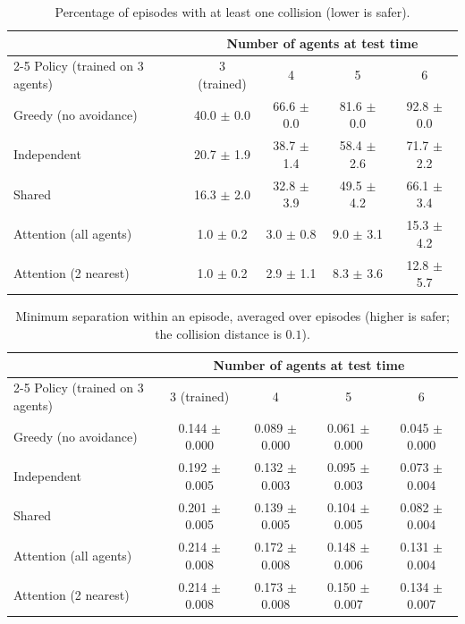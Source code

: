 \begin{table}[t]
  \centering\small
  \caption{Percentage of episodes with at least one collision (lower is safer).}
  \label{tab:pt-collision}
\begin{tabular}{l cccc}
\toprule
 & \multicolumn{4}{c}{Number of agents at test time} \\
\cmidrule(lr){2-5}
Policy (trained on 3 agents) & 3 (trained) & 4 & 5 & 6 \\
\midrule
Greedy (no avoidance) & 40.0 $\pm$ 0.0 & 66.6 $\pm$ 0.0 & 81.6 $\pm$ 0.0 & 92.8 $\pm$ 0.0 \\
\midrule
Independent & 20.7 $\pm$ 1.9 & 38.7 $\pm$ 1.4 & 58.4 $\pm$ 2.6 & 71.7 $\pm$ 2.2 \\
Shared & 16.3 $\pm$ 2.0 & 32.8 $\pm$ 3.9 & 49.5 $\pm$ 4.2 & 66.1 $\pm$ 3.4 \\
Attention (all agents) & 1.0 $\pm$ 0.2 & 3.0 $\pm$ 0.8 & 9.0 $\pm$ 3.1 & 15.3 $\pm$ 4.2 \\
Attention (2 nearest) & 1.0 $\pm$ 0.2 & 2.9 $\pm$ 1.1 & 8.3 $\pm$ 3.6 & 12.8 $\pm$ 5.7 \\
\midrule
\bottomrule
\end{tabular}
\end{table}

\begin{table}[t]
  \centering\small
  \caption{Minimum separation within an episode, averaged over episodes (higher is safer; the collision distance is
  $0.1$).}
  \label{tab:pt-minsep}
\begin{tabular}{l cccc}
\toprule
 & \multicolumn{4}{c}{Number of agents at test time} \\
\cmidrule(lr){2-5}
Policy (trained on 3 agents) & 3 (trained) & 4 & 5 & 6 \\
\midrule
Greedy (no avoidance) & 0.144 $\pm$ 0.000 & 0.089 $\pm$ 0.000 & 0.061 $\pm$ 0.000 & 0.045 $\pm$ 0.000 \\
\midrule
Independent & 0.192 $\pm$ 0.005 & 0.132 $\pm$ 0.003 & 0.095 $\pm$ 0.003 & 0.073 $\pm$ 0.004 \\
Shared & 0.201 $\pm$ 0.005 & 0.139 $\pm$ 0.005 & 0.104 $\pm$ 0.005 & 0.082 $\pm$ 0.004 \\
Attention (all agents) & 0.214 $\pm$ 0.008 & 0.172 $\pm$ 0.008 & 0.148 $\pm$ 0.006 & 0.131 $\pm$ 0.004 \\
Attention (2 nearest) & 0.214 $\pm$ 0.008 & 0.173 $\pm$ 0.008 & 0.150 $\pm$ 0.007 & 0.134 $\pm$ 0.007 \\
\midrule
\bottomrule
\end{tabular}
\end{table}

